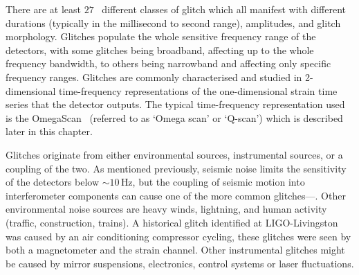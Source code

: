 
There are at least $27$~\cite{gravityspy:2023, gravityspy:2024} different classes of glitch which all manifest with different durations (typically in the millisecond to second range), amplitudes, and glitch morphology. Glitches populate the whole sensitive frequency range of the detectors, with some glitches being broadband, affecting up to the whole frequency bandwidth, to others being narrowband and affecting only specific frequency ranges. Glitches are commonly characterised and studied in 2-dimensional time-frequency representations of the one-dimensional strain time series that the detector outputs. The typical time-frequency representation used is the OmegaScan~\cite{qscan:2004} (referred to as `Omega scan' or `Q-scan') which is described later in this chapter.


Glitches originate from either environmental sources, instrumental sources, or a coupling of the two. As mentioned previously, seismic noise limits the sensitivity of the detectors below ${\sim}10 \, \text{Hz}$, but the coupling of seismic motion into interferometer components can cause one of the more common glitches---\scl. Other environmental noise sources are heavy winds, lightning, and human activity (traffic, construction, trains). A historical glitch identified at LIGO-Livingston was caused by an air conditioning compressor cycling, these glitches were seen by both a magnetometer and the \gwadj strain channel. Other instrumental glitches might be caused by mirror suspensions, electronics, control systems or laser fluctuations.


